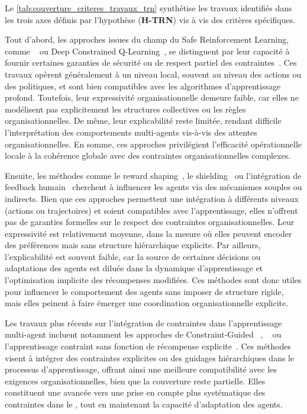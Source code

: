 Le \autoref{tab:couverture_criteres_travaux_trn} synthétise les travaux identifiés dans les trois axes définis par l'hypothèse (\textbf{H-TRN}) vis à vis des critères spécifiques.

Tout d'abord, les approches issues du champ du Safe Reinforcement Learning, comme ~\cite{achiam2017constrained} ou Deep Constrained Q-Learning~\cite{kalweit2020deep}, se distinguent par leur capacité à fournir certaines garanties de sécurité ou de respect partiel des contraintes~\cite{garcia2015comprehensive}. Ces travaux opèrent généralement à un niveau local, souvent au niveau des actions ou des politiques, et sont bien compatibles avec les algorithmes d'apprentissage profond. Toutefois, leur expressivité organisationnelle demeure faible, car elles ne modélisent pas explicitement les structures collectives ou les règles organisationnelles. De même, leur explicabilité reste limitée, rendant difficile l'interprétation des comportements multi-agents vis-à-vis des attentes organisationnelles. En somme, ces approches privilégient l'efficacité opérationnelle locale à la cohérence globale avec des contraintes organisationnelles complexes.

Ensuite, les méthodes comme le reward shaping~\cite{ng1999policy}, le shielding~\cite{amodei2016concrete} ou l'intégration de feedback humain~\cite{warnell2018deep, zhou2025mentor} cherchent à influencer les agents via des mécanismes souples ou indirects. Bien que ces approches permettent une intégration à différents niveaux (actions ou trajectoires) et soient compatibles avec l'apprentissage, elles n'offrent pas de garanties formelles sur le respect des contraintes organisationnelles. Leur expressivité est relativement moyenne, dans la mesure où elles peuvent encoder des préférences mais sans structure hiérarchique explicite. Par ailleurs, l'explicabilité est souvent faible, car la source de certaines décisions ou adaptations des agents est diluée dans la dynamique d'apprentissage et l'optimisation implicite des récompenses modifiées. Ces méthodes sont donc utiles pour influencer le comportement des agents sans imposer de structure rigide, mais elles peinent à faire émerger une coordination organisationnelle explicite.

Les travaux plus récents sur l'intégration de contraintes dans l'apprentissage multi-agent incluent notamment les approches de Constraint-Guided ~\cite{spieker2021constraint}, ~\cite{zhou2025mentor} ou l'apprentissage contraint sans fonction de récompense explicite~\cite{miryoosefi2022}. Ces méthodes visent à intégrer des contraintes explicites ou des guidages hiérarchiques dans le processus d'apprentissage, offrant ainsi une meilleure compatibilité avec les exigences organisationnelles, bien que la couverture reste partielle. Elles constituent une avancée vers une prise en compte plus systématique des contraintes dans le , tout en maintenant la capacité d'adaptation des agents.

